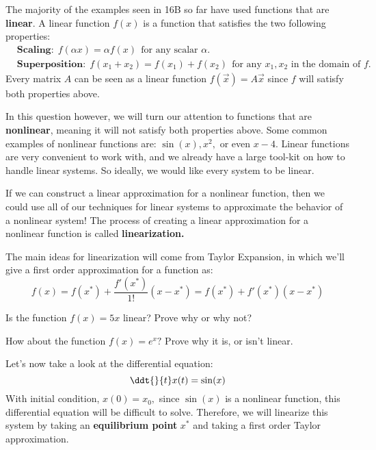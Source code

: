 

The majority of the examples seen in 16B so far have used functions that are \textbf{linear}.
A linear function $f(x)$ is a function that satisfies the two following properties:
\begin{align*}
  &\textbf{Scaling:} \ \ f(\alpha x) = \alpha f(x) \ \ \text{for any scalar $\alpha.$} \\
  &\textbf{Superposition:} \ \ f(x_{1} + x_{2}) = f(x_{1}) + f(x_{2}) \ \ \text{for any $x_{1}, x_{2}$ in the domain of $f.$}
\end{align*}
Every matrix $A$ can be seen as a linear function $f(\vec{x}) = A \vec{x}$ since $f$ will satisfy both properties above.

In this question however, we will turn our attention to functions that are \textbf{nonlinear}, meaning it will not satisfy both properties above. Some common examples of nonlinear functions are: $\sin(x), x^{2},$ or even $x - 4.$ 
Linear functions are very convenient to work with, and we already have a large tool-kit on how to handle linear systems. 
So ideally, we would like every system to be linear. 

If we can construct a linear approximation for a nonlinear function, then we could use all of our techniques for linear systems to approximate the behavior of a nonlinear system! 
The process of creating a linear approximation for a nonlinear function is called \textbf{linearization.}

The main ideas for linearization will come from Taylor Expansion, in which we'll give a first order approximation for a function as:
\begin{equation} \label{eqn:ta}
  f(x) = f(x^{*}) + \frac{f'(x^{*})}{1!} (x - x^{*}) = f(x^{*}) + f'(x^{*}) (x - x^{*})
\end{equation}
\begin{enumerate}
  \qitem Is the function $f(x) = 5x$ linear? Prove why or why not?

  \qitem How about the function $f(x) = e^{x}?$ Prove why it is, or isn't linear.
\end{enumerate}

Let's now take a look at the differential equation:
\begin{equation} \label{eqn:nl}
  \ddt{}{t} x(t) = \sin(x)
\end{equation}
With initial condition, $x(0) = x_{0},$ since $\sin(x)$ is a nonlinear function, this differential equation will be difficult to solve.
Therefore, we will linearize this system by taking an \textbf{equilibrium point} $x^{*}$ and taking a first order Taylor approximation.

